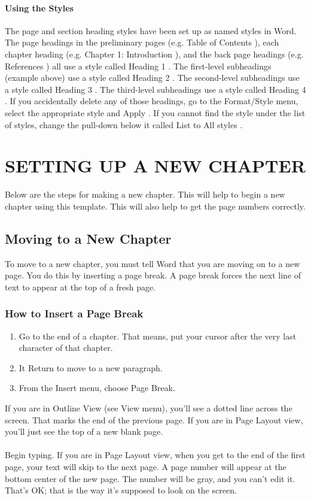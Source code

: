 \documentclass{article}
\begin{document}
\begin{justify}
\subsubsection{Using the Styles}
The page and section heading styles have been set up as named styles in Word.  The page headings in the preliminary pages (e.g.  Table of Contents ), each chapter heading (e.g.  Chapter 1: Introduction ), and the back page headings (e.g.  References ) all use a style called  Heading 1 .  The first-level subheadings (example above) use a style called  Heading 2 .  The second-level subheadings use a style called  Heading 3 . The third-level subheadings use a style called  Heading 4 .  If you accidentally delete any of those headings, go to the Format/Style menu, select the appropriate style and  Apply .  If you cannot find the style under the list of styles, change the pull-down below it called  List  to  All styles .
 \newpage
     \chapter{SETTING UP A NEW CHAPTER}
     Below are the steps for making a new chapter. This will help to begin a new chapter using this template. This will also help to get the page numbers correctly.
     \section{Moving to a New Chapter}
	To move to a new chapter, you must tell Word that you are moving on to a new page. You do this by inserting a page break. A page break forces the next line of text to appear at the top of a fresh page.
 
\subsection{How to Insert a Page Break}
\begin{enumerate} 
\item Go to the end of a chapter. That means, put your cursor after the very last character of that chapter.
\item It Return to move to a new paragraph.

    \item From the Insert menu, choose Page Break.
\end{enumerate}
If you are in Outline View (see View menu), you'll see a dotted line across the screen. That marks the end of the previous page. If you are in Page Layout view, you'll just see the top of a new blank page. \\~\\
Begin typing. If you are in Page Layout view, when you get to the end of the first page, your text will skip to the next page. A page number will appear at the bottom center of the new page. The number will be gray, and you can't edit it. That's OK; that is the way it's supposed to look on the screen.
\pagebreak

\end{justify}
\end{document}
